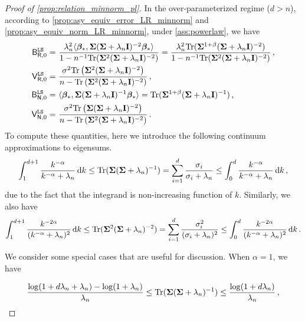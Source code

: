 \begin{proof}[Proof of \cref{prop:relation_minnorm_pl}]
In the over-parameterized regime ($d > n$), according to \cref{prop:asy_equiv_error_LR_minnorm} and \cref{prop:asy_equiv_norm_LR_minnorm}, under \cref{ass:powerlaw}, we have
\[
\begin{aligned}
    \mathsf B_{\mathsf R,0}^{\tt LS} =&~ \frac{\lambda_n^2\langle{\boldsymbol \beta}_*,{\boldsymbol \Sigma}({\boldsymbol \Sigma}+\lambda_n{\mathbf I})^{-2}{\boldsymbol \beta}_*\rangle}{1-n^{-1}{\rm Tr}({\boldsymbol \Sigma}^2({\boldsymbol \Sigma}+\lambda_n{\mathbf I})^{-2})} = \frac{\lambda_n^2{\rm Tr}({\boldsymbol \Sigma}^{1+\beta}({\boldsymbol \Sigma}+\lambda_n{\mathbf I})^{-2})}{1-n^{-1}{\rm Tr}({\boldsymbol \Sigma}^2({\boldsymbol \Sigma}+\lambda_n{\mathbf I})^{-2})}\,,\\
    \mathsf V_{\mathsf R,0}^{\tt LS} =&~ \frac{\sigma^2 {\rm Tr}\left({\boldsymbol \Sigma}^2 ({\boldsymbol \Sigma} + \lambda_n{\mathbf I})^{-2}\right)}{n - {\rm Tr}\left({\boldsymbol \Sigma}^2 ({\boldsymbol \Sigma} + \lambda_n{\mathbf I})^{-2}\right)}\,,\\
    \mathsf B_{\mathsf N,0}^{\tt LS} =&~ \langle{\boldsymbol \beta}_*,{\boldsymbol \Sigma}({\boldsymbol \Sigma}+\lambda_n{\mathbf I})^{-1}{\boldsymbol \beta}_*\rangle = {\rm Tr}({\boldsymbol \Sigma}^{1+\beta}({\boldsymbol \Sigma}+\lambda_n{\mathbf I})^{-1})\,,\\
    \mathsf V_{\mathsf N,0}^{\tt LS} =&~ \frac{\sigma^2 {\rm Tr}\left({\boldsymbol \Sigma} ({\boldsymbol \Sigma} + \lambda_n{\mathbf I})^{-2}\right)}{n - {\rm Tr}\left({\boldsymbol \Sigma}^2 ({\boldsymbol \Sigma} + \lambda_n{\mathbf I})^{-2}\right)}\,.
\end{aligned}
\]
To compute these quantities, here we introduce the following continuum approximations to eigensums.
\begin{equation}\label{eq:df1_inter_approx} 
\int_{1}^{d+1} \frac{k^{-\alpha}}{k^{-\alpha} + \lambda_n}\, \mathrm{d}k \leq {\rm Tr}({\boldsymbol \Sigma}({\boldsymbol \Sigma}+\lambda_n)^{-1}) = \sum_{i=1}^{d} \frac{\sigma_i}{\sigma_i + \lambda_n} \leq 
   \int_{0}^{d} \frac{k^{-\alpha}}{k^{-\alpha} + \lambda_n}\, \mathrm{d}k \,,
\end{equation}
due to the fact that the integrand is non-increasing function of $k$.
Similarly, we also have
\begin{equation}\label{eq:df2_inter_approx}\int_{1}^{d+1} \frac{k^{-2\alpha}}{(k^{-\alpha} + \lambda_n)^2}\, \mathrm{d}k \leq {\rm Tr}({\boldsymbol \Sigma}^2({\boldsymbol \Sigma}+\lambda_n)^{-2}) = \sum_{i=1}^{d} \frac{\sigma_i^2}{(\sigma_i + \lambda_n)^2} \leq  \int_{0}^{d} \frac{k^{-2\alpha}}{(k^{-\alpha} + \lambda_n)^2}\, \mathrm{d}k \,.
\end{equation}


We consider some special cases that are useful for discussion.
When $\alpha=1$, we have

\begin{equation}\label{eq:df1_inter_approx_alpha1}
   \frac{\log(1+d\lambda_n + \lambda_n) - \log (1+\lambda_n)}{\lambda_n}  \leq {\rm Tr}({\boldsymbol \Sigma}({\boldsymbol \Sigma}+\lambda_n)^{-1}) \leq  \frac{\log(1+d\lambda_n)}{\lambda_n} \,,
\end{equation}


\end{proof}
